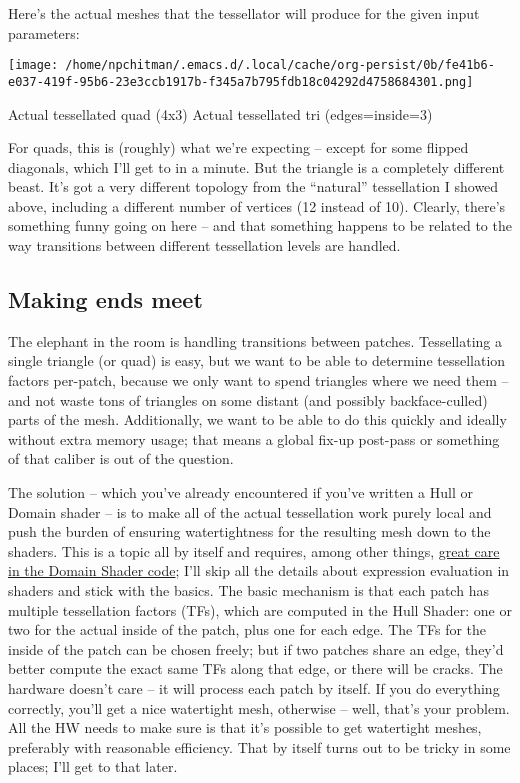 \documentclass[12pt]{article}
\begin{document}
Here’s the actual meshes that the tessellator will produce for the given input parameters:

\begin{center}
\texttt{[image: /home/npchitman/.emacs.d/.local/cache/org-persist/0b/fe41b6-e037-419f-95b6-23e3ccb1917b-f345a7b795fdb18c04292d4758684301.png]}
\end{center}
Actual tessellated quad (4x3) Actual tessellated tri (edges=inside=3)

For quads, this is (roughly) what we’re expecting – except for some flipped diagonals, which I’ll get to in a minute. But the triangle is a completely different beast. It’s got a very different topology from the “natural” tessellation I showed above, including a different number of vertices (12 instead of 10). Clearly, there’s something funny going on here – and that something happens to be related to the way transitions between different tessellation levels are handled.

\subsection{Making ends meet}
\label{sec:orgd48888a}

The elephant in the room is handling transitions between patches. Tessellating a single triangle (or quad) is easy, but we want to be able to determine tessellation factors per-patch, because we only want to spend triangles where we need them – and not waste tons of triangles on some distant (and possibly backface-culled) parts of the mesh. Additionally, we want to be able to do this quickly and ideally without extra memory usage; that means a global fix-up post-pass or something of that caliber is out of the question.

The solution – which you’ve already encountered if you’ve written a Hull or Domain shader – is to make all of the actual tessellation work purely local and push the burden of ensuring watertightness for the resulting mesh down to the shaders. This is a topic all by itself and requires, among other things, \href{http://www.ludicon.com/castano/blog/2010/09/precise/}{great care in the Domain Shader code}; I’ll skip all the details about expression evaluation in shaders and stick with the basics. The basic mechanism is that each patch has multiple tessellation factors (TFs), which are computed in the Hull Shader: one or two for the actual inside of the patch, plus one for each edge. The TFs for the inside of the patch can be chosen freely; but if two patches share an edge, they’d better compute the exact same TFs along that edge, or there will be cracks. The hardware doesn’t care – it will process each patch by itself. If you do everything correctly, you’ll get a nice watertight mesh, otherwise – well, that’s your problem. All the HW needs to make sure is that it’s possible to get watertight meshes, preferably with reasonable efficiency. That by itself turns out to be tricky in some places; I’ll get to that later.
\end{document}
